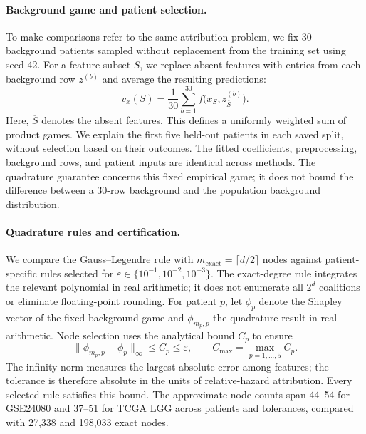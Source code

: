 \paragraph{Background game and patient selection.}
To make comparisons refer to the same attribution problem, we fix 30
background patients sampled without replacement from the training set
using seed 42. For a feature subset $S$, we replace absent features
with entries from each background row $z^{(b)}$ and average the
resulting predictions:
\[
 v_x(S)=\frac{1}{30}\sum_{b=1}^{30}
 f\bigl(x_S,z^{(b)}_{\overline S}\bigr).
\]
Here, $\overline S$ denotes the absent features. This defines a uniformly
weighted sum of product games. We explain the first five held-out
patients in each saved split, without selection based on their outcomes.
The fitted coefficients, preprocessing, background rows, and patient
inputs are identical across methods. The quadrature guarantee concerns
this fixed empirical game; it does not bound the difference between a
30-row background and the population background distribution.

\paragraph{Quadrature rules and certification.}
We compare the Gauss--Legendre rule with
$m_{\mathrm{exact}}=\lceil d/2\rceil$ nodes against patient-specific
rules selected for $\varepsilon\in\{10^{-1},10^{-2},10^{-3}\}$.
The exact-degree rule integrates the relevant polynomial in real
arithmetic; it does not enumerate all $2^d$ coalitions or eliminate
floating-point rounding. For patient $p$, let $\phi_p$ denote the
Shapley vector of the fixed background game and $\phi_{m_p,p}$ the
quadrature result in real arithmetic. Node selection uses the analytical
bound $C_p$ to ensure
\[
 \|\phi_{m_p,p}-\phi_p\|_\infty\le C_p\le\varepsilon,
 \qquad C_{\max}=\max_{p=1,\ldots,5}C_p.
\]
The infinity norm measures the largest absolute error among features;
the tolerance is therefore absolute in the units of relative-hazard
attribution. Every selected rule satisfies this bound. The approximate
node counts span 44--54 for GSE24080 and 37--51 for TCGA LGG across
patients and tolerances, compared with 27,338 and 198,033 exact nodes.

